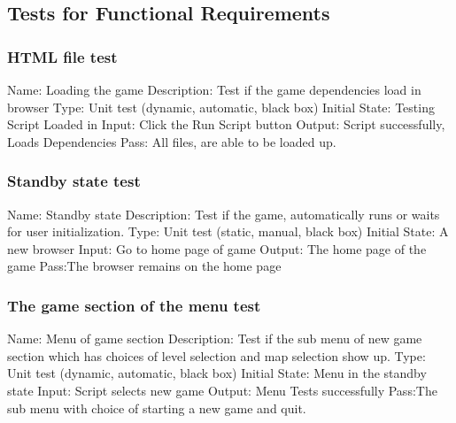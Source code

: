 \documentclass{article}
\begin{document}
\subsection{Tests for Functional Requirements}
\subsubsection{HTML file test}
Name:  Loading the game \newline
Description: Test if the game dependencies load in browser
\newline
Type: Unit test (dynamic, automatic, black box) \newline
Initial State:  Testing Script Loaded in \newline
Input: Click the Run Script button \newline
Output: Script successfully, Loads Dependencies \newline
Pass:  All files, are able to be loaded up. \newline

\subsubsection{Standby state test}
Name:  Standby state\newline
Description: Test if the game, automatically runs or waits
for user initialization. \newline
Type: Unit test (static, manual, black box) \newline
Initial State: A new browser \newline
Input: Go to home page of game \newline
Output: The home page of the game \newline
Pass:The browser remains on the home page \newline

\subsubsection{The game section of the menu test}
Name: Menu of game section\newline
Description: Test if the sub menu of new game section which has choices of 
level selection and map selection show up.
\newline
Type: Unit test (dynamic, automatic, black box) \newline
Initial State: Menu in the standby state \newline
Input: Script selects new game \newline
Output:  Menu Tests successfully  \newline
Pass:The sub menu with choice of starting a new game and quit. \newline
\end{document}
